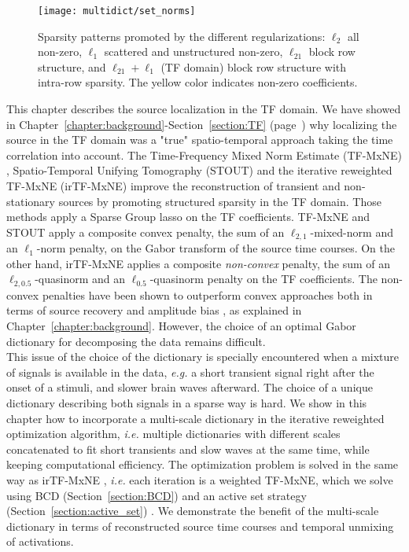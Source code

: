 \begin{figure}
\centering
	\texttt{[image: multidict/set\_norms]}
    \caption{Sparsity patterns promoted by the different regularizations: $\ell_2$ all non-zero, $\ell_1$ scattered and unstructured non-zero, $\ell_{21}$ block row structure, and $\ell_{21} + \ell_1$ (TF domain) block row structure with intra-row sparsity. The yellow color indicates non-zero coefficients.}
    \label{fig:set_norms}
\end{figure}

This chapter describes the source localization in the \ac{TF} domain. We have showed in Chapter~\ref{chapter:background}-Section~\ref{section:TF} (page~\pageref{section:TF}) why localizing the source in the \ac{TF} domain was a "true" spatio-temporal approach taking the time correlation into account.
The Time-Frequency Mixed Norm Estimate (TF-MxNE) \cite{Alex13}, Spatio-Temporal Unifying Tomography (STOUT) \cite{castano2015solving} and the iterative reweighted TF-MxNE (irTF-MxNE) \cite{daniel15} improve the reconstruction of transient and non-stationary sources by promoting structured sparsity in the TF domain. Those methods apply a Sparse Group \ac{lasso} on the TF coefficients. TF-MxNE and STOUT apply a composite convex penalty, the sum of an $\ell_{2, 1}$-mixed-norm and an $\ell_{1}$-norm penalty, on the Gabor transform of the source time courses. On the other hand, irTF-MxNE applies a composite \emph{non-convex} penalty, the sum of an $\ell_{2, 0.5}$-quasinorm and an $\ell_{0.5}$-quasinorm penalty on the TF coefficients.
The non-convex penalties have been shown to outperform convex approaches both in terms of source recovery and amplitude bias \cite{candes2008enhancing,daubechies2010iteratively}, as explained in Chapter~\ref{chapter:background}. However, the choice of an optimal Gabor dictionary for decomposing the data remains difficult.\\

This issue of the choice of the dictionary is specially encountered when a mixture of signals is available in the data, \textit{e.g.} a short transient signal right after the onset of a stimuli, and slower brain waves afterward. The choice of a unique dictionary describing both signals in a sparse way is hard. We show in this chapter how to incorporate a multi-scale dictionary in the iterative reweighted optimization algorithm, \textit{i.e.} multiple dictionaries with different scales concatenated to fit short transients and slow waves at the same time, while keeping computational efficiency. The optimization problem is solved in the same way as irTF-MxNE \cite{daniel15}, \textit{i.e.} each iteration is a weighted TF-MxNE, which we solve using \ac{BCD} (Section~\ref{section:BCD}) and an active set strategy (Section~\ref{section:active_set}) \cite{friedman2010regularization}. %
We demonstrate the benefit of the multi-scale dictionary in terms of reconstructed source time courses and temporal unmixing of activations.

